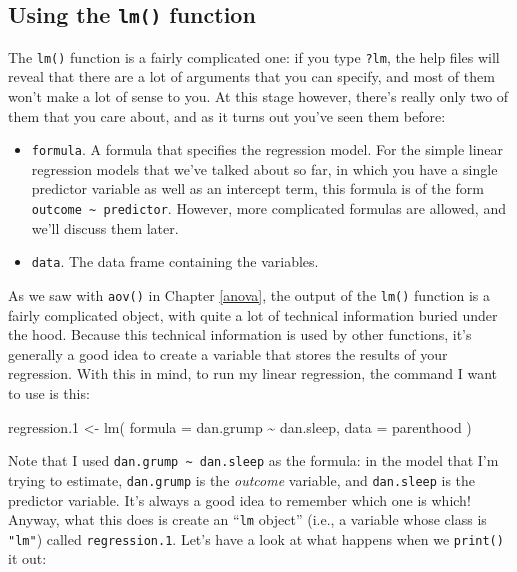 \documentclass[
]{book}
\newenvironment{Shaded}{\begin{snugshade}}{\end{snugshade}}
\newcommand{\AttributeTok}[1]{\textcolor[rgb]{0.77,0.63,0.00}{#1}}
\newcommand{\FloatTok}[1]{\textcolor[rgb]{0.00,0.00,0.81}{#1}}
\newcommand{\FunctionTok}[1]{\textcolor[rgb]{0.00,0.00,0.00}{#1}}
\newcommand{\NormalTok}[1]{#1}
\newcommand{\OtherTok}[1]{\textcolor[rgb]{0.56,0.35,0.01}{#1}}
\newcommand{\SpecialCharTok}[1]{\textcolor[rgb]{0.00,0.00,0.00}{#1}}
\providecommand{\tightlist}{%
  \setlength{\itemsep}{0pt}\setlength{\parskip}{0pt}}
\begin{document}
\hypertarget{lm}{%
\subsection{\texorpdfstring{Using the \texttt{lm()} function}{Using the lm() function}}\label{lm}}

The \texttt{lm()} function is a fairly complicated one: if you type \texttt{?lm}, the help files will reveal that there are a lot of arguments that you can specify, and most of them won't make a lot of sense to you. At this stage however, there's really only two of them that you care about, and as it turns out you've seen them before:

\begin{itemize}
\tightlist
\item
  \texttt{formula}. A formula that specifies the regression model. For the simple linear regression models that we've talked about so far, in which you have a single predictor variable as well as an intercept term, this formula is of the form \texttt{outcome\ \textasciitilde{}\ predictor}. However, more complicated formulas are allowed, and we'll discuss them later.
\item
  \texttt{data}. The data frame containing the variables.
\end{itemize}

As we saw with \texttt{aov()} in Chapter \ref{anova}, the output of the \texttt{lm()} function is a fairly complicated object, with quite a lot of technical information buried under the hood. Because this technical information is used by other functions, it's generally a good idea to create a variable that stores the results of your regression. With this in mind, to run my linear regression, the command I want to use is this:

\begin{Shaded}
\begin{Highlighting}[]
\NormalTok{regression}\FloatTok{.1} \OtherTok{\textless{}{-}} \FunctionTok{lm}\NormalTok{( }\AttributeTok{formula =}\NormalTok{ dan.grump }\SpecialCharTok{\textasciitilde{}}\NormalTok{ dan.sleep,  }
                    \AttributeTok{data =}\NormalTok{ parenthood )  }
\end{Highlighting}
\end{Shaded}

Note that I used \texttt{dan.grump\ \textasciitilde{}\ dan.sleep} as the formula: in the model that I'm trying to estimate, \texttt{dan.grump} is the \emph{outcome} variable, and \texttt{dan.sleep} is the predictor variable. It's always a good idea to remember which one is which! Anyway, what this does is create an ``\texttt{lm} object'' (i.e., a variable whose class is \texttt{"lm"}) called \texttt{regression.1}. Let's have a look at what happens when we \texttt{print()} it out:
\end{document}
